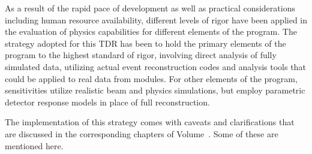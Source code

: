 As a result of the rapid pace of development as well as 
practical considerations including human 
resource availability, different levels
of rigor have been applied in the evaluation of physics 
capabilities for different elements of the program.  
The strategy adopted for
this TDR has been to hold the primary elements of the program
to the highest standard of rigor, involving direct analysis
of fully simulated data, utilizing actual event reconstruction
codes and analysis tools that could be applied to real data
from   modules.  For other elements of the
program, sensitivities utilize realistic beam and
physics simulations, but employ parametric detector
response models in place of full reconstruction.

The implementation of this strategy comes with caveats
and clarifications that are discussed in the corresponding
chapters of Volume~\volnumberphysics{}.   
Some of these are mentioned here.

